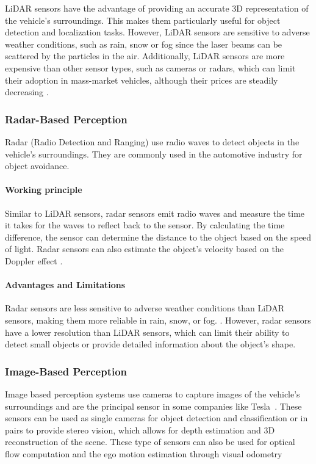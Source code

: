 LiDAR sensors have the advantage of providing an accurate 3D representation of the vehicle's surroundings.
This makes them particularly useful for object detection and localization tasks. However, LiDAR sensors
are sensitive to adverse weather conditions, such as rain, snow or fog since the laser beams can be scattered
by the particles in the air. Additionally, LiDAR sensors are more expensive than other sensor types, such as
cameras or radars, which can limit their adoption in mass-market vehicles, although their prices are steadily decreasing \cite{autonomous_vehicles_perception_survey}.

\subsubsection{Radar-Based Perception}

Radar (Radio Detection and Ranging) use radio waves to detect objects in the vehicle's surroundings. They are commonly
used in the automotive industry for object avoidance. 

\paragraph{Working principle} Similar to LiDAR sensors, radar sensors emit radio waves and measure the time it takes for the waves to reflect back to the sensor. 
By calculating the time difference, the sensor can determine the distance to the object based on the speed of light. 
Radar sensors can also estimate the object's velocity based on the Doppler effect \cite{radarbased_velocity}.

\paragraph{Advantages and Limitations} Radar sensors are less sensitive to adverse weather conditions than LiDAR sensors, making them more reliable in rain, snow, or fog. \cite{autonomous_vehicles_perception_survey, radarbased_weather}. 
However, radar sensors have a lower resolution than LiDAR sensors, which can limit their ability to detect small objects or provide detailed information about the object's shape.

\subsubsection{Image-Based Perception}

Image based perception systems use cameras to capture images of the vehicle's surroundings and are the principal sensor
in some companies like Tesla~\cite{tesla_autopilot}. These sensors can be used as single cameras for object detection
and classification  or in pairs to provide stereo vision, which allows for depth estimation and 3D reconstruction of the scene.
These type of sensors can also be used for optical flow computation and the ego motion estimation through visual odometry

